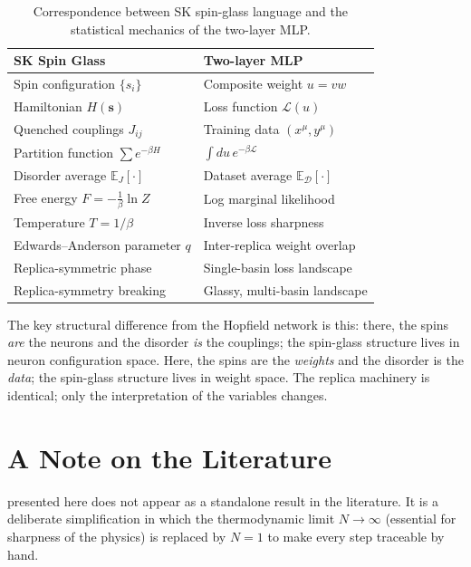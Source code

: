 \documentclass[nobib,justified]{tufte-handout}
\newcommand{\EE}{\mathbb{E}}
\newcommand{\cD}{\mathcal{D}}
\newcommand{\cL}{\mathcal{L}}
\begin{document}
\begin{table}[h]
\centering
\begin{singlespace}
\small
\begin{tabular}{@{}ll@{}}
\toprule
\textbf{SK Spin Glass} & \textbf{Two-layer MLP} \\
\midrule
Spin configuration $\{s_i\}$        & Composite weight $u = vw$ \\
Hamiltonian $H(\mathbf{s})$          & Loss function $\cL(u)$ \\
Quenched couplings $J_{ij}$          & Training data $(x^\mu,y^\mu)$ \\
Partition function $\sum e^{-\beta H}$ & $\int du\,e^{-\beta\cL}$ \\
Disorder average $\EE_J[\cdot]$       & Dataset average $\EE_{\cD}[\cdot]$ \\
Free energy $F=-\frac{1}{\beta}\ln Z$  & Log marginal likelihood \\
Temperature $T=1/\beta$               & Inverse loss sharpness \\
Edwards--Anderson parameter $q$        & Inter-replica weight overlap \\
Replica-symmetric phase               & Single-basin loss landscape \\
Replica-symmetry breaking             & Glassy, multi-basin landscape \\
\bottomrule
\end{tabular}
\end{singlespace}
\caption{Correspondence between SK spin-glass language and the
  statistical mechanics of the two-layer MLP.}
\label{tab:corr}
\end{table}

The key structural difference from the Hopfield network is this: there,
the spins \emph{are} the neurons and the disorder \emph{is} the
couplings; the spin-glass structure lives in neuron configuration space.
Here, the spins are the \emph{weights} and the disorder is the
\emph{data}; the spin-glass structure lives in weight space.  The
replica machinery is identical; only the interpretation of the variables
changes.

\section{A Note on the Literature}

 presented here does not appear as a
standalone result in the literature.  It is a deliberate simplification
in which the thermodynamic limit $N\to\infty$ (essential for sharpness
of the physics) is replaced by $N=1$ to make every step traceable by
hand.
\end{document}

